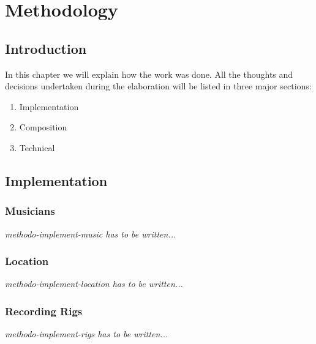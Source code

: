 \documentclass[letterpaper, openright]{report}
\begin{document}
	\vspace{0.5cm}

	\newpage

\chapter{Methodology} %
\label{sec:methodo}

	\section{Introduction} %
	\label{sub:methodo-intro}
In this chapter we will explain how the work was done. All the thoughts and decisions undertaken during the elaboration will be listed in three major sections: 
\begin{enumerate}
\item Implementation
\item Composition
\item Technical
\end{enumerate}
    
    \section{Implementation} %
	\label{sub:methodo-implement}

			\subsection{Musicians} %
			\label{subsub:methodo-implement-music}
\textit{methodo-implement-music has to be written...}
            
            \subsection{Location} %
			\label{subsub:methodo-implement-location}
\textit{methodo-implement-location has to be written...}
            
            \subsection{Recording Rigs} %
			\label{subsub:methodo-implement-rigs}
\textit{methodo-implement-rigs has to be written...}
\end{document}
